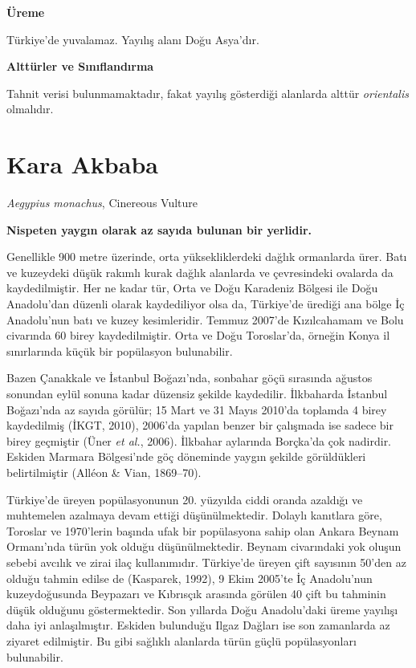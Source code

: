 \documentclass[
  a4paper,
  DIV=11,
  numbers=noendperiod]{scrreprt}
\begin{document}
\textbf{Üreme}

Türkiye'de yuvalamaz. Yayılış alanı Doğu Asya'dır.

\textbf{Alttürler ve Sınıflandırma}

Tahnit verisi bulunmamaktadır, fakat yayılış gösterdiği alanlarda alttür
\emph{orientalis} olmalıdır.

\section{Kara Akbaba}\label{kara-akbaba}

\emph{Aegypius monachus}, Cinereous Vulture

\textbf{Nispeten yaygın olarak az sayıda bulunan bir yerlidir.}

Genellikle 900 metre üzerinde, orta yüksekliklerdeki dağlık ormanlarda
ürer. Batı ve kuzeydeki düşük rakımlı kurak dağlık alanlarda ve
çevresindeki ovalarda da kaydedilmiştir. Her ne kadar tür, Orta ve Doğu
Karadeniz Bölgesi ile Doğu Anadolu'dan düzenli olarak kaydediliyor olsa
da, Türkiye'de ürediği ana bölge İç Anadolu'nun batı ve kuzey
kesimleridir. Temmuz 2007'de Kızılcahamam ve Bolu civarında 60 birey
kaydedilmiştir. Orta ve Doğu Toroslar'da, örneğin Konya il sınırlarında
küçük bir popülasyon bulunabilir.

Bazen Çanakkale ve İstanbul Boğazı'nda, sonbahar göçü sırasında ağustos
sonundan eylül sonuna kadar düzensiz şekilde kaydedilir. İlkbaharda
İstanbul Boğazı'nda az sayıda görülür; 15 Mart ve 31 Mayıs 2010'da
toplamda 4 birey kaydedilmiş (İKGT, 2010), 2006'da yapılan benzer bir
çalışmada ise sadece bir birey geçmiştir (Üner \emph{et al.}, 2006).
İlkbahar aylarında Borçka'da çok nadirdir. Eskiden Marmara Bölgesi'nde
göç döneminde yaygın şekilde görüldükleri belirtilmiştir (Alléon \&
Vian, 1869--70).

Türkiye'de üreyen popülasyonunun 20. yüzyılda ciddi oranda azaldığı ve
muhtemelen azalmaya devam ettiği düşünülmektedir. Dolaylı kanıtlara
göre, Toroslar ve 1970'lerin başında ufak bir popülasyona sahip olan
Ankara Beynam Ormanı'nda türün yok olduğu düşünülmektedir. Beynam
civarındaki yok oluşun sebebi avcılık ve zirai ilaç kullanımıdır.
Türkiye'de üreyen çift sayısının 50'den az olduğu tahmin edilse de
(Kasparek, 1992), 9 Ekim 2005'te İç Anadolu'nun kuzeydoğusunda Beypazarı
ve Kıbrısçık arasında görülen 40 çift bu tahminin düşük olduğunu
göstermektedir. Son yıllarda Doğu Anadolu'daki üreme yayılışı daha iyi
anlaşılmıştır. Eskiden bulunduğu Ilgaz Dağları ise son zamanlarda az
ziyaret edilmiştir. Bu gibi sağlıklı alanlarda türün güçlü
popülasyonları bulunabilir.
\end{document}
